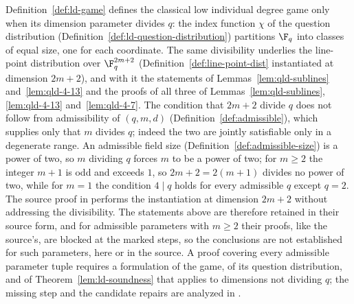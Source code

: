 \begin{remark}
	\label{rem:qld-4-7-divisibility}
	Definition~\ref{def:ld-game} defines the classical low individual
	degree game only when its dimension parameter divides $q$: the index
	function $\chi$ of the question distribution
	(Definition~\ref{def:ld-question-distribution}) partitions $\F_q$ into
	classes of equal size, one for each coordinate. The same divisibility
	underlies the line-point distribution over $\F_q^{2m+2}$
	(Definition~\ref{def:line-point-dist} instantiated at dimension
	$2m+2$), and with it the statements of Lemmas~\ref{lem:qld-sublines}
	and~\ref{lem:qld-4-13} and the proofs of all three of
	Lemmas~\ref{lem:qld-sublines}, \ref{lem:qld-4-13}
	and~\ref{lem:qld-4-7}. The condition that $2m+2$ divide $q$ does not
	follow from admissibility of $(q,m,d)$
	(Definition~\ref{def:admissible}), which supplies only that $m$
	divides $q$; indeed the two are jointly satisfiable only in a
	degenerate range. An admissible field size
	(Definition~\ref{def:admissible-size}) is a power of two, so $m$
	dividing $q$ forces $m$ to be a power of two; for $m \ge 2$ the
	integer $m+1$ is odd and exceeds $1$, so $2m+2 = 2(m+1)$ divides no
	power of two, while for $m = 1$ the condition $4 \mid q$ holds for
	every admissible $q$ except $q = 2$. The source proof in
	\cite{Ji2020MIPStar} performs the instantiation at dimension $2m+2$
	without addressing the divisibility. The statements above are
	therefore retained in their source form, and for admissible
	parameters with $m \ge 2$ their proofs, like the source's, are
	blocked at the marked steps, so the conclusions are not established
	for such parameters, here or in the source. A proof covering every
	admissible parameter tuple requires a formulation of the game, of its
	question distribution, and of Theorem~\ref{lem:ld-soundness} that
	applies to dimensions not dividing $q$; the missing step and the
	candidate repairs are analyzed in
	\cite{gap:qpbt_ld-dimension-divisibility}.
\end{remark}


